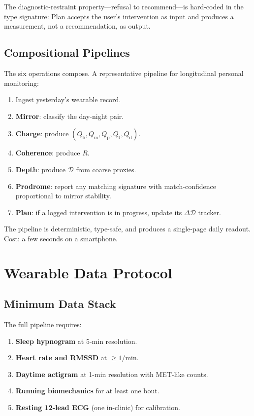 \documentclass[11pt,twocolumn,a4paper]{article}
\theoremstyle{definition}
\theoremstyle{remark}
\newcommand{\Qb}{Q_{\mathrm{b}}}
\newcommand{\Qm}{Q_{\mathrm{m}}}
\newcommand{\Qp}{Q_{\mathrm{p}}}
\newcommand{\Qt}{Q_{\mathrm{t}}}
\newcommand{\Qd}{Q_{\mathrm{d}}}
\newcommand{\Dhier}{\mathcal{D}}
\newcommand{\Rcoh}{R}
\begin{document}
The diagnostic-restraint property---refusal to recommend---is
hard-coded in the type signature: Plan accepts the user's
intervention as input and produces a measurement, not a
recommendation, as output.

\subsection{Compositional Pipelines}

The six operations compose. A representative pipeline for
longitudinal personal monitoring:

\begin{enumerate}[leftmargin=*]
\item Ingest yesterday's wearable record.
\item \textbf{Mirror}: classify the day-night pair.
\item \textbf{Charge}: produce $(\Qb, \Qm, \Qp, \Qt, \Qd)$.
\item \textbf{Coherence}: produce $\Rcoh$.
\item \textbf{Depth}: produce $\Dhier$ from coarse proxies.
\item \textbf{Prodrome}: report any matching signature with
match-confidence proportional to mirror stability.
\item \textbf{Plan}: if a logged intervention is in progress,
update its $\Delta \Dhier$ tracker.
\end{enumerate}

The pipeline is deterministic, type-safe, and produces a
single-page daily readout. Cost: a few seconds on a smartphone.

\section{Wearable Data Protocol}
\label{sec:protocol}

\subsection{Minimum Data Stack}

The full pipeline requires:
\begin{enumerate}[leftmargin=*]
\item \textbf{Sleep hypnogram} at 5-min resolution.
\item \textbf{Heart rate and RMSSD} at $\geq 1/\text{min}$.
\item \textbf{Daytime actigram} at 1-min resolution with MET-like
counts.
\item \textbf{Running biomechanics} for at least one bout.
\item \textbf{Resting 12-lead ECG} (one in-clinic) for calibration.
\end{enumerate}
\end{document}
